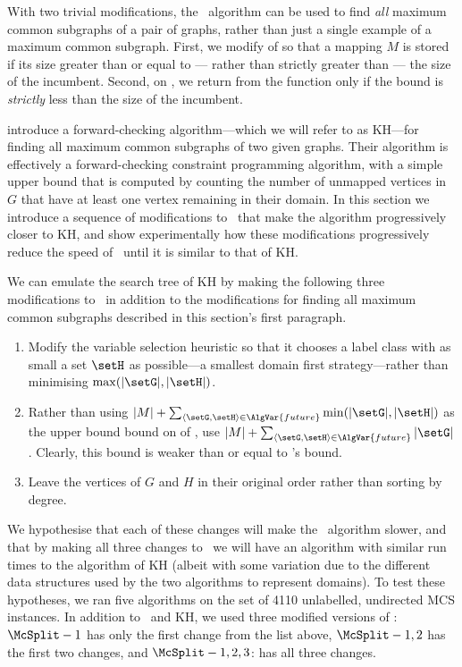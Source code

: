 With two trivial modifications, the \McSplit\ algorithm can be used to find
\emph{all} maximum common subgraphs of a pair of graphs, rather than just a single
example of a maximum common subgraph.
First, we modify  of  so that
a mapping $M$ is stored if its size greater than or equal to --- rather than
strictly greater than --- the size of the incumbent.  Second, on ,
we return from the function only if the bound is \emph{strictly} less than the
size of the incumbent.

\citet{DBLP:journals/spe/KrissinelH04} introduce a forward-checking
algorithm---which we will refer to as KH---for finding all maximum common
subgraphs of two given graphs.  Their algorithm is effectively a
forward-checking constraint programming algorithm, with a simple upper bound
that is computed by counting the number of unmapped vertices in $G$ that have
at least one vertex remaining in their domain.  In this section we
introduce a sequence of modifications to \McSplit\ that make the algorithm
progressively closer to KH, and show experimentally how these modifications
progressively reduce the speed of \McSplit\ until it is similar to that of KH.

We can emulate the search tree of KH
by making the following three modifications to \McSplit\ in addition to the modifications for
finding all maximum common subgraphs described in this section's first paragraph.

\begin{enumerate}
    \item Modify the variable selection heuristic so that it chooses a label class with
as small a set $\setH$ as possible---a smallest domain first strategy---rather than minimising $\max(|\setG|,|\setH|)$.
    \item Rather 
than using $|M|  + \sum_{\langle \setG,\setH \rangle \in \AlgVar{future}} \min(|\setG|,|\setH|)$
as the upper bound bound on  of ,
use $|M|  + \sum_{\langle \setG,\setH \rangle \in \AlgVar{future}} |\setG|$.  Clearly,
this bound is weaker than or equal to \McSplit's bound.
    \item Leave the vertices of $G$ and $H$ in their original order rather than sorting
        by degree.
\end{enumerate}

We hypothesise that each of these changes will make the \McSplit\ algorithm slower, and that
by making all three changes to \McSplit\ we will have an algorithm with similar run times
to the algorithm of KH (albeit with some variation due to the different data structures
used by the two algorithms to represent domains).
To test these hypotheses, we ran five algorithms
on the set of 4110 unlabelled, undirected MCS instances.  In addition to \McSplit\ and
KH, we used three modified versions of \McSplit:
$\McSplit - 1$ has only the first change from the list above,
$\McSplit - 1,2$ has the first two changes, and
$\McSplit - 1,2,3$: has all three changes.

